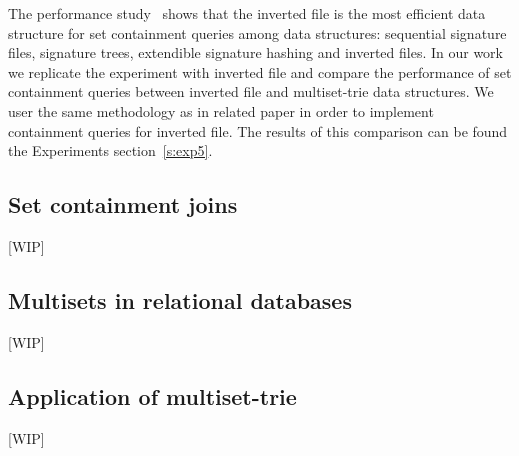 The performance study~\cite{Helmer2003} shows that the inverted file is the most efficient data structure for set containment queries 
among data structures: sequential signature files, signature trees, extendible signature hashing and inverted files. 
In our work we replicate the experiment with inverted file and compare the performance of set containment queries between inverted file and multiset-trie data structures. We user the same methodology as in related paper in order to implement containment queries for inverted file.
The results of this comparison can be found the Experiments section~\ref{s:exp5}.




\subsection{Set containment joins}
[WIP]


\subsection{Multisets in relational databases}
[WIP]


\subsection{Application of multiset-trie}
[WIP]








